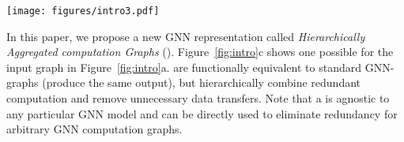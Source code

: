 
\begin{figure*}
    \centering
    \texttt{[image: figures/intro3.pdf]}
    \caption{Comparison between a GNN-graph and an equivalent \xg.
    (a) Input graph; (b) 1-layer GNN-graph; (c) \xg that avoids redundant computation.
    The GNN-graph computes new activations $h^{(k)}_v$ by aggregating the previous-layer activations of its network neighbors.
    Because nodes in the input graph share common neighbors, the GNN-graph performs redundant computation (e.g., both $\{A, B\}$ and $\{C, D\}$ are aggregated twice). By identifying common computational patterns, the \xg avoids repeated computation.
    }
    \label{fig:intro}
\end{figure*}

In this paper, we propose a new GNN representation called {\em Hierarchically Aggregated computation Graphs} (\xgs).
Figure~\ref{fig:intro}c shows one possible \xg for the input graph in Figure~\ref{fig:intro}a. %
\xgs are functionally equivalent to standard GNN-graphs (produce the same output), but hierarchically combine redundant computation and remove unnecessary data transfers.
Note that a \xg is agnostic to any particular GNN model and can be directly used to eliminate redundancy for arbitrary GNN computation graphs.

